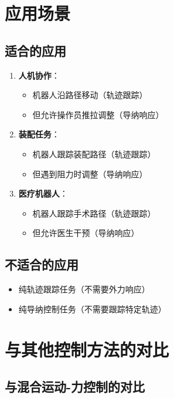 \documentclass[12pt,a4paper]{article}
\begin{document}
\section{应用场景}

\subsection{适合的应用}

\begin{enumerate}
\item \textbf{人机协作}：
\begin{itemize}
\item 机器人沿路径移动（轨迹跟踪）
\item 但允许操作员推拉调整（导纳响应）
\end{itemize}

\item \textbf{装配任务}：
\begin{itemize}
\item 机器人跟踪装配路径（轨迹跟踪）
\item 但遇到阻力时调整（导纳响应）
\end{itemize}

\item \textbf{医疗机器人}：
\begin{itemize}
\item 机器人跟踪手术路径（轨迹跟踪）
\item 但允许医生干预（导纳响应）
\end{itemize}
\end{enumerate}

\subsection{不适合的应用}

\begin{itemize}
\item 纯轨迹跟踪任务（不需要外力响应）
\item 纯导纳控制任务（不需要跟踪特定轨迹）
\end{itemize}

\section{与其他控制方法的对比}

\subsection{与混合运动-力控制的对比}
\end{document}
